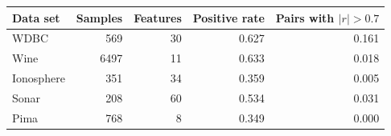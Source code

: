 \begin{tabular}{lrrrr}
\toprule
Data set & Samples & Features & Positive rate & Pairs with $|r|>0.7$ \\
\midrule
WDBC & 569 & 30 & 0.627 & 0.161 \\
Wine & 6497 & 11 & 0.633 & 0.018 \\
Ionosphere & 351 & 34 & 0.359 & 0.005 \\
Sonar & 208 & 60 & 0.534 & 0.031 \\
Pima & 768 & 8 & 0.349 & 0.000 \\
\bottomrule
\end{tabular}
